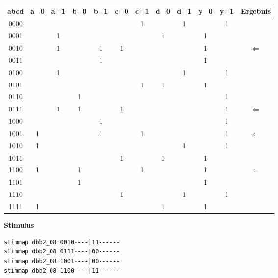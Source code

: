 \documentclass[fleqn]{article}
\begin{document}
\begin{center}
    \begin{tabular}{|c|c|c|c|c|c|c|c|c|c|c|c|}
        \hline
        abcd&a=0&a=1&b=0&b=1&c=0&c=1&d=0&d=1&y=0&y=1&Ergebnis\\
        \hline
        0000&&&&&&1&&1&&1&\\
        \hline
        0001&&1&&&&&1&&1&&\\
        \hline
        0010&&1&&1&1&&&&1&&$\Leftarrow$\\
        \hline
        0011&&&&1&&&&&1&&\\
        \hline
        0100&&1&&&&&&1&&1&\\
        \hline
        0101&&&&&&1&1&&1&&\\
        \hline
        0110&&&1&&&&&&&1&\\
        \hline
        0111&&1&1&&1&&&&&1&$\Leftarrow$\\
        \hline
        1000&&&&1&&&&&&1&\\
        \hline
        1001&1&&&1&&1&&&&1&$\Leftarrow$\\
        \hline
        1010&1&&&&&&&1&&1&\\
        \hline
        1011&&&&&1&&1&&1&&\\
        \hline
        1100&1&&1&&&1&&&1&&$\Leftarrow$\\
        \hline
        1101&&&1&&&&&&1&&\\
        \hline
        1110&&&&&1&&&1&&1&\\
        \hline
        1111&1&&&&&&1&&1&&\\
        \hline
    \end{tabular}
\end{center}

\textbf{Stimulus}

\begin{lstlisting}
stimmap dbb2_08 0010----|11------
stimmap dbb2_08 0111----|00------
stimmap dbb2_08 1001----|00------
stimmap dbb2_08 1100----|11------
\end{lstlisting}
\end{document}
